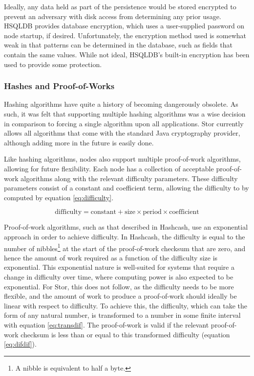 			Ideally, any data held as part of the persistence would be stored encrypted to prevent an adversary with disk access from determining any prior usage. HSQLDB provides database encryption, which uses a user-supplied password on node startup, if desired. Unfortunately, the encryption method used is somewhat weak in that patterns can be determined in the database, such as fields that contain the same values. While not ideal, HSQLDB's built-in encryption has been used to provide some protection.
		\subsubsection*{Hashes and Proof-of-Works}
			Hashing algorithms have quite a history of becoming dangerously obsolete. As such, it was felt that supporting multiple hashing algorithms was a wise decision in comparison to forcing a single algorithm upon all applications. Stor currently allows all algorithms that come with the standard Java cryptography provider, although adding more in the future is easily done. 
		
			Like hashing algorithms, nodes also support multiple proof-of-work algorithms, allowing for future flexibility. Each node has a collection of acceptable proof-of-work algorithms along with the relevant difficulty parameters. These difficulty parameters consist of a constant and coefficient term, allowing the difficulty to by computed by equation \ref{eq:difficulty}. 
		
			\begin{equation} \label{eq:difficulty}
			\text{difficulty} = \text{constant} + \text{size} \times \text{period} \times \text{coefficient}
			\end{equation}
			
			Proof-of-work algorithms, such as that described in Hashcash, use an exponential approach in order to achieve difficulty. In Hashcash, the difficulty is equal to the number of nibbles\footnote{A nibble is equivalent to half a byte.} at the start of the proof-of-work checksum that are zero, and hence the amount of work required as a function of the difficulty size is exponential. This exponential nature is well-suited for systems that require a change in difficulty over time, where computing power is also expected to be exponential. For Stor, this does not follow, as the difficulty needs to be more flexible, and the amount of work to produce a proof-of-work should ideally be linear with respect to difficulty. To achieve this, the difficulty, which can take the form of any natural number, is transformed to a number in some finite interval with equation \ref{eq:transdif}. The proof-of-work is valid if the relevant proof-of-work checksum is less than or equal to this transformed difficulty (equation \ref{eq:difdif}).
		
